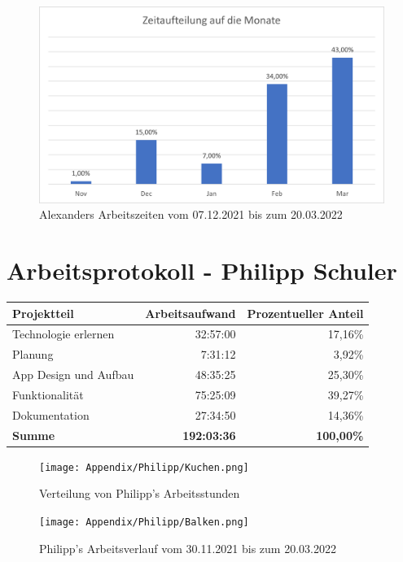 \begin{figure}[H]
    \begin{center}
        \includegraphics[width=1\textwidth]{images/Zeiten/Zeitaufteilung-auf-Monate-Bertoni.png}
        \caption{Alexanders Arbeitszeiten vom 07.12.2021 bis zum 20.03.2022}
    \end{center}
\end{figure}

\newpage
\section*{Arbeitsprotokoll - Philipp Schuler}

\begin{table}[H]
\begin{tabular}{lrr}
\hline
\textbf{Projektteil}  & \textbf{Arbeitsaufwand} & \textbf{Prozentueller Anteil} \\ \hline
Technologie erlernen  & 32:57:00                   & 17,16\%                    \\
Planung               &  7:31:12                   &  3,92\%                    \\
App Design und Aufbau & 48:35:25                   & 25,30\%                    \\
Funktionalität        & 75:25:09                   & 39,27\%                    \\
Dokumentation         & 27:34:50                   & 14,36\%                    \\ \hline
\textbf{Summe}        & \textbf{192:03:36}         & \textbf{100,00\%}             \\ \hline
\end{tabular}
\end{table}

\begin{figure}[H]
    \begin{center}
        \texttt{[image: Appendix/Philipp/Kuchen.png]}
        \caption{Verteilung von Philipp's Arbeitsstunden}
    \end{center}
\end{figure}

\begin{figure}[H]
    \begin{center}
        \texttt{[image: Appendix/Philipp/Balken.png]}
        \caption{Philipp's Arbeitsverlauf vom 30.11.2021 bis zum 20.03.2022}
    \end{center}
\end{figure}
